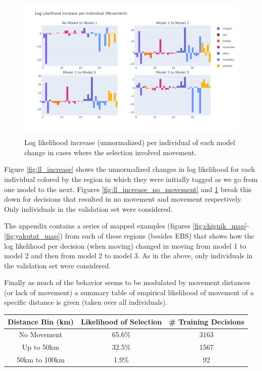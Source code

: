 \documentclass[11pt]{article}
\begin{document}
\begin{figure}[h!] 
	\centering
  \includegraphics[height=70mm]{figures/ll_increase_movement.png}
  \caption{Log likelihood increase (unnormalized) per individual of each model change in cases where the selection involved movement.}
  \label{fig:ll_increase_movement}
\end{figure}



Figure \ref{fig:ll_increase} shows the unnormalized changes in log likelihood for each individual colored by the region in which they were initially tagged as we go from one model to the next. Figures \ref{fig:ll_increase_no_movement} and \ref{fig:ll_increase_movement} break this down for decisions that resulted in no movement and movement respectively. Only individuals in the validation set were considered.

The appendix contains a series of mapped examples (figures \ref{fig:chignik_map}-\ref{fig:yakutat_map}) from each of these regions (besides EBS) that shows how the log likelihood per decision (when moving) changed in moving from model 1 to model 2 and then from model 2 to model 3. As in the above, only individuals in the validation set were considered.\newline

Finally as much of the behavior seems to be modulated by movement distances (or lack of movement) a summary table of empirical likelihood of movement of a specific distance is given (taken over all individuals). 

\begin{center}
\begin{tabular}{| c | c | c |}
\hline
Distance Bin (km) & Likelihood of Selection & \# Training Decisions \\
\hline
No Movement & 65.6\% & 3163 \\
Up to 50km & 32.5\% & 1567 \\
50km to 100km & 1.9\% & 92 \\
\hline

\end{tabular}
\end{center}
\end{document}
